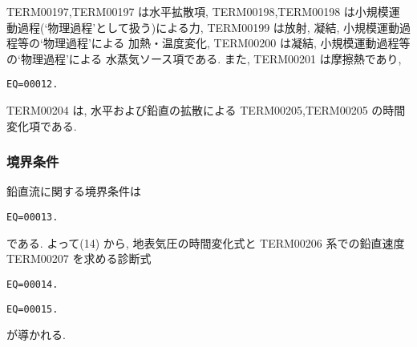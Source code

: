 TERM00197,TERM00197
は水平拡散項,
TERM00198,TERM00198
は小規模運動過程(`物理過程'として扱う)による力,
TERM00199 は放射, 凝結, 小規模運動過程等の`物理過程'による
加熱・温度変化,
TERM00200 は凝結, 小規模運動過程等の`物理過程'による
水蒸気ソース項である.
また, TERM00201 は摩擦熱であり,
%
\begin{verbatim}
EQ=00012.
\end{verbatim}
%
TERM00204 は,
水平および鉛直の拡散による TERM00205,TERM00205 の時間変化項である.

\subsubsection{境界条件}

鉛直流に関する境界条件は
%
\begin{verbatim}
EQ=00013.
\end{verbatim}
%
である. よって(14) から,
地表気圧の時間変化式と
TERM00206 系での鉛直速度 TERM00207 を求める診断式
%
\begin{verbatim}
EQ=00014.
\end{verbatim}
%
\begin{verbatim}
EQ=00015.
\end{verbatim}
%
が導かれる.



